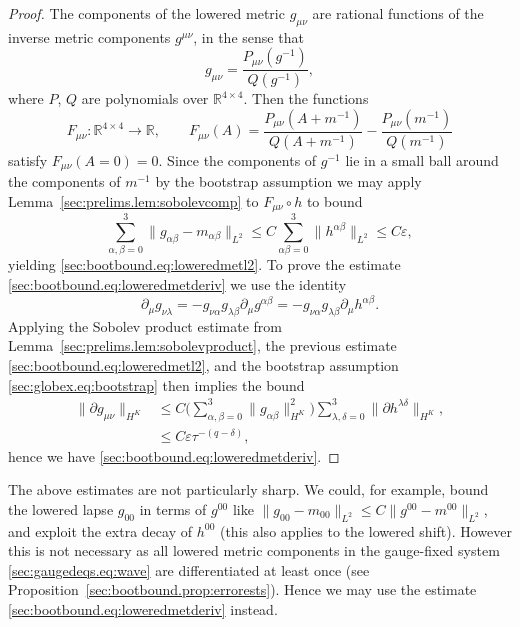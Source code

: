 \documentclass{article}
\newcommand{\RR}{\mathbb{R}}
\newcommand{\ve}{\varepsilon}
\newcommand{\pa}{\partial}
\newcommand{\ra}{\rightarrow}
\begin{document}
\begin{proof}
    The components of the lowered metric $g_{\mu\nu}$ are rational functions of the inverse metric components $g^{\mu\nu}$, in the sense that
    \begin{equation}
        g_{\mu\nu} = \frac{P_{\mu\nu}(g^{-1})}{Q(g^{-1})},
    \end{equation}
    where $P$, $Q$ are polynomials over $\RR^{4\times 4}$. Then the functions
    \begin{equation}
        F_{\mu\nu}:\RR^{4\times 4} \ra \RR,\qquad F_{\mu\nu}(A) = \frac{P_{\mu\nu}(A +m^{-1})}{Q(A+m^{-1})} - \frac{P_{\mu\nu}(m^{-1})}{Q(m^{-1})}
    \end{equation}
    satisfy $F_{\mu\nu}(A=0) = 0$. Since the components of $g^{-1}$ lie in a small ball around the components of $m^{-1}$ by the bootstrap assumption we may apply Lemma~\ref{sec:prelims.lem:sobolevcomp} to $F_{\mu\nu} \circ h$ to bound
    \begin{equation}
        \sum_{\alpha,\beta=0}^3 \|g_{\alpha\beta} - m_{\alpha\beta}\|_{L^2} \leq C\sum_{\alpha\beta=0}^3 \|h^{\alpha\beta}\|_{L^2} \leq C\ve,
    \end{equation}
    yielding \eqref{sec:bootbound.eq:loweredmetl2}. To prove the estimate \eqref{sec:bootbound.eq:loweredmetderiv} we use the identity
    \begin{equation}
        \pa_\mu g_{\nu\lambda} = -g_{\nu\alpha}g_{\lambda\beta}\pa_\mu g^{\alpha\beta} = -g_{\nu\alpha}g_{\lambda\beta}\pa_\mu h^{\alpha\beta}.
    \end{equation}
    Applying the Sobolev product estimate from Lemma~\ref{sec:prelims.lem:sobolevproduct}, the previous estimate \eqref{sec:bootbound.eq:loweredmetl2}, and the bootstrap assumption \eqref{sec:globex.eq:bootstrap} then implies the bound
    \begin{align}
        \|\pa g_{\mu\nu}\|_{H^K} &\leq C\Big(\sum_{\alpha,\beta=0}^3\|g_{\alpha\beta}\|_{H^K}^2\Big)\sum_{\lambda,\delta = 0}^3\|\pa h^{\lambda\delta}\|_{H^K},\\
        &\leq C\ve\tau^{-(q-\delta)},
    \end{align}
    hence we have \eqref{sec:bootbound.eq:loweredmetderiv}.
\end{proof}
\begin{remark}
    The above estimates are not particularly sharp. We could, for example, bound the lowered lapse $g_{00}$ in terms of $g^{00}$ like $\|g_{00}-m_{00}\|_{L^2} \leq C\|g^{00}-m^{00}\|_{L^2}$, and exploit the extra decay of $h^{00}$ (this also applies to the lowered shift). However this is not necessary as all lowered metric components in the gauge-fixed system \eqref{sec:gaugedeqs.eq:wave} are differentiated at least once (see Proposition~\ref{sec:bootbound.prop:errorests}). Hence we may use the estimate \eqref{sec:bootbound.eq:loweredmetderiv} instead.
\end{remark}
\end{document}
